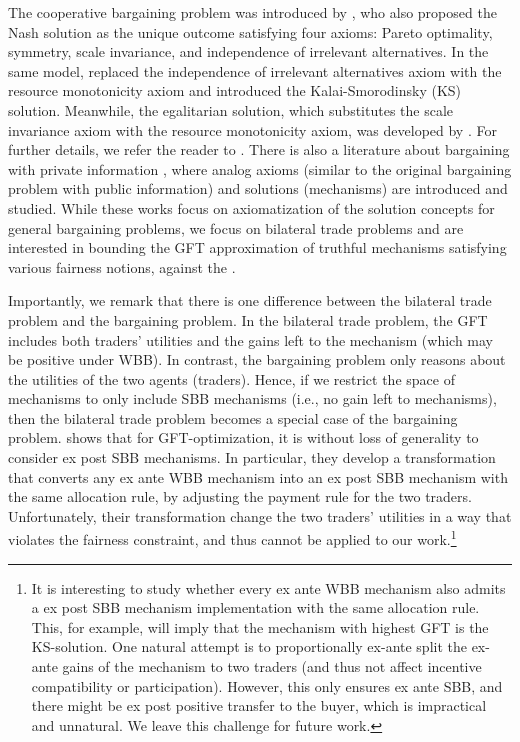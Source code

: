  \label{subsubsec:related-bargaining}
The cooperative bargaining problem was introduced by \citet{N-50}, who also proposed the Nash solution as the unique outcome satisfying four axioms: Pareto optimality, symmetry, scale invariance, and independence of irrelevant alternatives. In the same model, \citet{KS-75} replaced the independence of irrelevant alternatives axiom with the resource monotonicity axiom and introduced the Kalai-Smorodinsky (KS) solution. Meanwhile, the egalitarian solution, which substitutes the scale invariance axiom with the resource monotonicity axiom, was developed by \citet{Kal-77,Mye-77}. For further details, we refer the reader to \citet{AH-92}. There is also a literature about bargaining with private information \citep[e.g.,][]{HS-72,Mye-84,Sam-84,KW-93,ACD-02}, where analog axioms (similar to the original bargaining problem with public information) and solutions (mechanisms) are introduced and studied. While these works focus on axiomatization of the solution concepts for general bargaining problems, we focus on bilateral trade problems and are interested in bounding the GFT approximation of truthful mechanisms satisfying various fairness notions, against the {\SecondBest}.



Importantly, we remark that there is one difference between the bilateral trade problem and the bargaining problem. In the bilateral trade problem, the GFT includes both traders' utilities and the gains left to the mechanism (which may be positive under WBB). In contrast, the bargaining problem only reasons about the utilities of {the} two agents (traders). Hence, if we restrict {the space of mechanisms to only include} SBB mechanisms (i.e., no gain left to mechanisms), then the bilateral trade problem becomes a special case of the bargaining problem. \citet{BCWZ-17} shows that for GFT-optimization, it is without loss of generality to consider ex post SBB mechanisms. In particular, they develop a transformation that converts any ex ante WBB mechanism into an ex post SBB mechanism with the same allocation rule, by adjusting the payment rule for the two traders. Unfortunately, their transformation change the two traders' utilities {in a way that violates the fairness constraint,} and thus cannot be applied to our work.\footnote{It is interesting to study whether every {\ksfair} ex ante WBB mechanism also admits a {\ksfair} ex post SBB mechanism implementation with the same allocation rule. {This, for example, will imply that the {\ksfair} mechanism with highest GFT is the KS-solution.} {One natural attempt is to proportionally ex-ante split the ex-ante gains of the mechanism to two traders (and thus not affect incentive compatibility or participation).} However, this only ensures ex ante SBB, and there might be ex post positive transfer to the buyer, which is impractical and unnatural. We leave this challenge for future work.}



